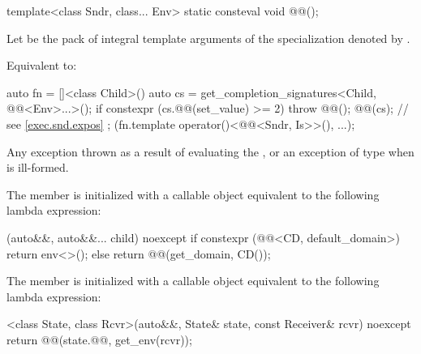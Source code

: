 \begin{itemdecl}
template<class Sndr, class... Env>
  static consteval void @@();
\end{itemdecl}

\begin{itemdescr}
\pnum
Let  be the pack of integral template arguments of
the  specialization denoted by
.

\pnum
\effects
Equivalent to:
\begin{codeblock}
auto fn = []<class Child>() {
  auto cs = get_completion_signatures<Child, @@<Env>...>();
  if constexpr (cs.@@(set_value) >= 2)
    throw @@();
  @@(cs); // see \ref{exec.snd.expos}
};
(fn.template operator()<@@<Sndr, Is>>(), ...);
\end{codeblock}

\pnum
\throws
Any exception thrown as a result of evaluating the , or
an exception of type
when  is ill-formed.
\end{itemdescr}

\pnum
The member 
is initialized with a callable object
equivalent to the following lambda expression:
\begin{codeblock}
[](auto&&, auto&&... child) noexcept {
  if constexpr (@@<CD, default_domain>) {
    return env<>();
  } else {
    return @@(get_domain, CD());
  }
}
\end{codeblock}

\pnum
The member 
is initialized with a callable object
equivalent to the following lambda expression:
\begin{codeblock}
[]<class State, class Rcvr>(auto&&, State& state, const Receiver& rcvr) noexcept {
  return @@(state.@@, get_env(rcvr));
}
\end{codeblock}

